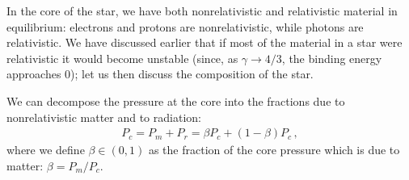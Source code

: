 \documentclass[main.tex]{subfiles}
\begin{document}






In the core of the star, we have both nonrelativistic and relativistic material in equilibrium: electrons and protons are nonrelativistic, while photons are relativistic.
We have discussed earlier that if most of the material in a star were relativistic it would become unstable (since, as \(\gamma \to 4/3\), the binding energy approaches 0); let us then discuss the composition of the star. 


We can decompose the pressure at the core into the fractions due to nonrelativistic matter and to radiation:
%
\begin{align}
  P_c = P_m  + P_r = \beta P_c + (1 - \beta )P_c
\,,
\end{align}
%
where we define \(\beta \in (0,1)\) as the fraction of the core pressure which is due to matter: \(\beta = P_m / P_c\).
\end{document}
